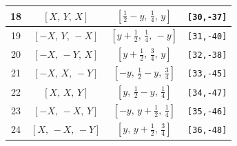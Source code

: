 \documentclass[fleqn,8pt]{jsarticle}
\begin{document}
\begin{longtable}{cccc}
18 & $\left[ X,\, Y,\, X \right]$ & $\left[ \frac{1}{2} - y,\, \frac{1}{4},\, y \right]$ & {\tt [30,-37]} \\ \hline
19 & $\left[ - X,\, Y,\, - X \right]$ & $\left[ y + \frac{1}{2},\, \frac{1}{4},\, - y \right]$ & {\tt [31,-40]} \\ \hline
20 & $\left[ - X,\, - Y,\, X \right]$ & $\left[ y + \frac{1}{2},\, \frac{3}{4},\, y \right]$ & {\tt [32,-38]} \\ \hline
21 & $\left[ - X,\, X,\, - Y \right]$ & $\left[ - y,\, \frac{1}{2} - y,\, \frac{3}{4} \right]$ & {\tt [33,-45]} \\ \hline
22 & $\left[ X,\, X,\, Y \right]$ & $\left[ y,\, \frac{1}{2} - y,\, \frac{1}{4} \right]$ & {\tt [34,-47]} \\ \hline
23 & $\left[ - X,\, - X,\, Y \right]$ & $\left[ - y,\, y + \frac{1}{2},\, \frac{1}{4} \right]$ & {\tt [35,-46]} \\ \hline
24 & $\left[ X,\, - X,\, - Y \right]$ & $\left[ y,\, y + \frac{1}{2},\, \frac{3}{4} \right]$ & {\tt [36,-48]} \\
\end{longtable}
\renewcommand{\arraystretch}{1.2}
\end{document}
